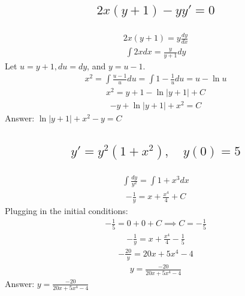 \documentclass{article}
\begin{document}
\subsection{
	\begin{align*}
		2x(y + 1) - y y' = 0
	\end{align*}
}
\begin{align*}
	2x(y + 1) = y \frac{dy}{dx}
\end{align*}
\begin{align*}
	\int{2xdx} = \frac{y}{y + 1}dy
\end{align*}
Let $u = y + 1, du = dy$, and $y = u - 1$.
\begin{align*}
	x^2 = \int{\frac{u - 1}{u}du} = \int{1 - \frac{1}{u}du} = u - \ln{u}
\end{align*}
\begin{align*}
	x^2 = y + 1 - \ln{|y + 1|} + C
\end{align*}
\begin{align*}
	-y + \ln{|y + 1|} + x^2 = C
\end{align*}
Answer: $\ln{|y + 1|} + x^2 - y = C$

\subsection{
	\begin{align*}
		y' = y^2(1 + x^2), \quad y(0) = 5
	\end{align*}
}
\begin{align*}
	\int{\frac{dy}{y^2}} = \int{1 + x^3 dx}
\end{align*}
\begin{align*}
	-\frac{1}{y} = x + \frac{x^4}{4} + C
\end{align*}
Plugging in the initial conditions:
\begin{align*}
	-\frac{1}{5} = 0 + 0 + C \implies C = -\frac{1}{5}
\end{align*}
\begin{align*}
	-\frac{1}{y} = x + \frac{x^4}{4} - \frac{1}{5}
\end{align*}
\begin{align*}
	-\frac{20}{y} = 20x + 5x^4 - 4
\end{align*}
\begin{align*}
	y = \frac{-20}{20x + 5x^4 - 4}
\end{align*}
Answer: $y = \frac{-20 }{20x + 5x^4 - 4}$

\end{document}
